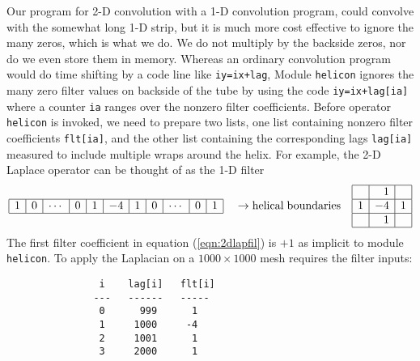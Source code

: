 \par
Our program for 2-D convolution with a 1-D convolution program,
could convolve with the somewhat long 1-D strip,
but it is much more cost effective to ignore the many zeros,
which is what we do.
We do not multiply by the backside zeros, nor do we even store them in memory.
Whereas an ordinary convolution program would do time shifting
by a code line like {\tt iy=ix+lag},
Module
\texttt{helicon} %
ignores the many zero filter values on backside of the tube
by using the code {\tt iy=ix+lag[ia]}
where a counter {\tt ia} ranges over the nonzero filter coefficients.
Before operator {\tt helicon} is invoked,
we need to prepare two lists,
one list containing nonzero filter coefficients {\tt flt[ia]},
and the other list containing the corresponding lags {\tt lag[ia]}
measured to include multiple wraps around the helix.
For example, the 2-D Laplace operator
can be thought of as the 1-D filter
\begin{equation}
\label{eqn:2dlapfil}
\begin{array}{|r|r|r|r|r|r|r|r|r|r|r|r|r|r|r|} \hline
1&0&\cdots&0&1&-4&1&0& \cdots&0&1
\\ \hline
\end{array}
%
\quad
\rightarrow{\rm helical \; boundaries}
\quad
\begin{array}{|r|r|r|}  \hline
& 1 & \\
\hline
1 & -4 & 1\\
\hline
& 1 & \\
\hline
\end{array}
\end{equation}
%
%
%
The first filter coefficient in equation (\ref{eqn:2dlapfil})
is $+1$ as implicit to module {\tt helicon}.
To apply the Laplacian on a $1000\times 1000$ mesh
requires the filter inputs:
\par\noindent
\footnotesize
\begin{verbatim}
                i    lag[i]   flt[i]
               ---   ------   -----
                0      999      1
                1     1000     -4
                2     1001      1
                3     2000      1
\end{verbatim}
\normalsize

